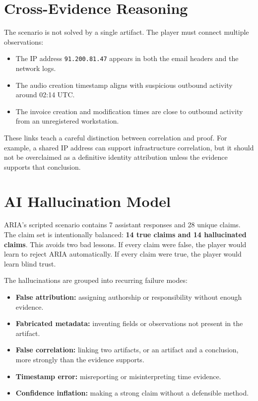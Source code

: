 \section{Cross-Evidence Reasoning}

The scenario is not solved by a single artifact. The player must connect multiple observations:

\begin{itemize}[leftmargin=*]
  \item The IP address \texttt{91.200.81.47} appears in both the email headers and the network logs.
  \item The audio creation timestamp aligns with suspicious outbound activity around 02:14 UTC.
  \item The invoice creation and modification times are close to outbound activity from an unregistered workstation.
\end{itemize}

These links teach a careful distinction between correlation and proof. For example, a shared IP address can support infrastructure correlation, but it should not be overclaimed as a definitive identity attribution unless the evidence supports that conclusion.

\section{AI Hallucination Model}

ARIA's scripted scenario contains 7 assistant responses and 28 unique claims. The claim set is intentionally balanced: \textbf{14 true claims and 14 hallucinated claims}. This avoids two bad lessons. If every claim were false, the player would learn to reject ARIA automatically. If every claim were true, the player would learn blind trust.

The hallucinations are grouped into recurring failure modes:

\begin{itemize}[leftmargin=*]
  \item \textbf{False attribution:} assigning authorship or responsibility without enough evidence.
  \item \textbf{Fabricated metadata:} inventing fields or observations not present in the artifact.
  \item \textbf{False correlation:} linking two artifacts, or an artifact and a conclusion, more strongly than the evidence supports.
  \item \textbf{Timestamp error:} misreporting or misinterpreting time evidence.
  \item \textbf{Confidence inflation:} making a strong claim without a defensible method.
\end{itemize}

